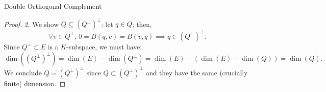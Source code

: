 \begin{appendixitem}{Double Orthogonal Complement}
\begin{proof}
        \textit{2.} We show \( Q \subseteq \left(Q^{\perp}\right)^{\perp} \): let \( q \in Q \); then,
        \[
            \forall v \in Q^\perp, \, 0=B\left(q, v\right) = B\left(v,q\right) \implies q \in \left(Q^{\perp}\right)^{\perp}.
        \]
        Since \( Q^{\perp}\subset E \) is a \( K \)-subspace, we must have:
        \[
            \dim\left(\left(Q^{\perp}\right)^{\perp}\right) = \dim\left(E\right) - \dim\left(Q^{\perp}\right) = \dim\left(E\right) - \left(\dim\left(E\right) - \dim\left(Q\right)\right) = \dim\left(Q\right).
        \]
        We conclude \( Q = \left(Q^{\perp}\right)^{\perp} \) since \( Q \subset \left(Q^{\perp}\right)^{\perp} \) and they have the same (crucially finite) dimension.
    \end{proof}
\end{appendixitem}
